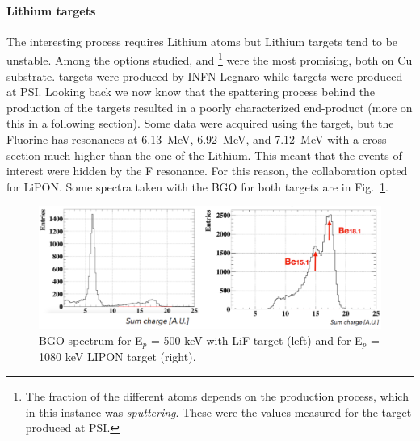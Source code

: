 \begin{refsection}
        \paragraph{Lithium targets}
        The interesting process requires Lithium atoms but Lithium targets tend to be unstable. 
        Among the options studied,  and \footnote{The fraction of the different atoms depends on the production process, which in this instance was \textit{sputtering}. These were the values measured for the target produced at PSI.} were the most promising, both on Cu substrate.
         targets were produced by INFN Legnaro while  targets were produced at PSI.
        Looking back we now know that the spattering process behind the production of the  targets resulted in a poorly characterized end-product (more on this in a following section). 
        Some data were acquired using the  target, but the Fluorine has resonances  at \SI{6.13}{MeV}, \SI{6.92}{MeV}, and \SI{7.12}{MeV} with a cross-section much higher than the one of the Lithium.
        This meant that the events of interest were hidden by the F resonance.
        For this reason, the collaboration opted for LiPON.
        Some spectra taken with the BGO for both targets are in Fig.~\ref{fig:X17:BGO:targets}.

        \begin{figure}
            \centering
            \includegraphics[width=0.9\linewidth]{Figures//X17//X17_Feb2023/X17_BGO_targets.pdf}
            \caption[X17: BGO LiF and LIPON spectra]{BGO spectrum for E$_p$ = 500 keV with LiF target (left) and  for E$_p$ = 1080 keV LIPON target (right).}
            \label{fig:X17:BGO:targets}
            \end{figure}
            

\end{refsection}
